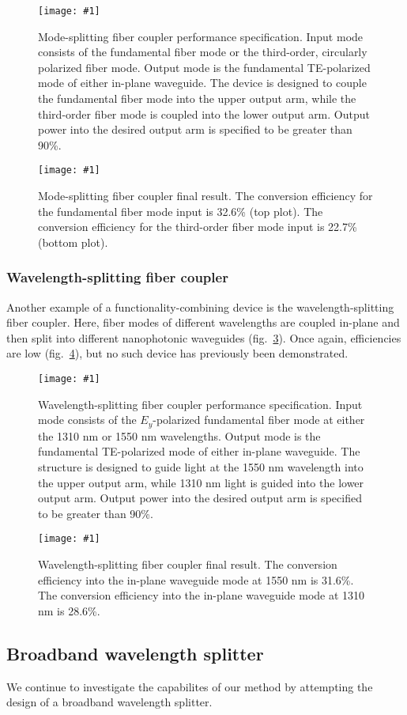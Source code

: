 \documentclass[letterpaper,10pt]{article}
\newcommand{\myfig}[2]{
    \begin{figure}[!h]
    \begin{centering}
    \texttt{[image: \#1]}
    \caption{#2}\label{#1}
    \end{centering}
    \end{figure}
}
\newcommand{\fig}[1]{fig.~\ref{#1}}
\begin{document}
\myfig{3Db_fib_pol}
    {Mode-splitting fiber coupler performance specification.
    Input mode consists of the fundamental fiber mode or 
        the third-order, circularly polarized fiber mode.
    Output mode is the fundamental TE-polarized mode of either in-plane waveguide.
    The device is designed to couple the fundamental fiber mode into
        the upper output arm, 
        while the third-order fiber mode is coupled into the lower output arm.
    Output power into the desired output arm is specified to be greater than 90\%.}
\myfig{fib_pol}
    {Mode-splitting fiber coupler final result.
    The conversion efficiency for the fundamental fiber mode input is 32.6\% 
        (top plot).
    The conversion efficiency for the third-order fiber mode input is 22.7\% 
        (bottom plot).}

\subsubsection{Wavelength-splitting fiber coupler}
Another example of a functionality-combining device is the wavelength-splitting
    fiber coupler.
Here, fiber modes of different wavelengths are coupled in-plane
    and then split into different nanophotonic waveguides (\fig{3Db_fib_wdm}).
Once again, efficiencies are low (\fig{fib_wdm}),
    but no such device has previously been demonstrated.

\myfig{3Db_fib_wdm}
    {Wavelength-splitting fiber coupler performance specification.
    Input mode consists of the $E_y$-polarized fundamental fiber mode at either
        the 1310 nm or 1550 nm wavelengths.
    Output mode is the fundamental TE-polarized mode of either in-plane waveguide.
    The structure is designed to guide light at the 1550 nm wavelength
        into the upper output arm,
        while 1310 nm light is guided into the lower output arm.
    Output power into the desired output arm is specified to be greater than 90\%.}
\myfig{fib_wdm}
    {Wavelength-splitting fiber coupler final result.
    The conversion efficiency into the in-plane waveguide mode at 1550 nm is 31.6\%.
    The conversion efficiency into the in-plane waveguide mode at 1310 nm is 28.6\%.}

\subsection{Broadband wavelength splitter}
We continue to investigate the capabilites of our method
    by attempting the design of a broadband wavelength splitter.
\end{document}
